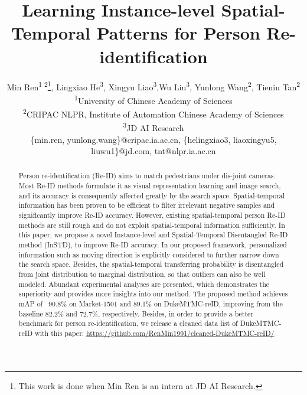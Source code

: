 \documentclass[10pt,twocolumn,letterpaper]{article}
\begin{document}
\title{Learning Instance-level Spatial-Temporal Patterns for Person Re-identification}

\author{Min Ren\textsuperscript{1 2}\thanks{This work is done when Min Ren is an intern at JD AI Research.}, Lingxiao He\textsuperscript{3}, Xingyu Liao\textsuperscript{3},Wu Liu\textsuperscript{3}, Yunlong Wang\textsuperscript{2}, Tieniu Tan\textsuperscript{2}\\
\textsuperscript{1}University of Chinese Academy of Sciences\\
\textsuperscript{2}CRIPAC NLPR, Institute of Automation Chinese Academy of Sciences\\
\textsuperscript{3}JD AI Research\\
\{min.ren, yunlong.wang\}@cripac.ia.ac.cn, \{helingxiao3, liaoxingyu5, liuwu1\}@jd.com, tnt@nlpr.ia.ac.cn
}

\maketitle
\ificcvfinal\thispagestyle{empty}\fi

\begin{abstract}
Person re-identification (Re-ID) aims to match pedestrians under dis-joint cameras.
Most Re-ID methods formulate it as visual representation learning and image search, and its accuracy is consequently affected greatly by the search space.
Spatial-temporal information has been proven to be efficient to filter irrelevant negative samples and significantly improve Re-ID accuracy.
However, existing spatial-temporal person Re-ID methods are still rough and do not exploit spatial-temporal information sufficiently.
In this paper, we propose a novel Instance-level and Spatial-Temporal Disentangled Re-ID method (InSTD), to improve Re-ID accuracy.
In our proposed framework, personalized information such as moving direction is explicitly considered to further narrow down the search space.
Besides, the spatial-temporal transferring probability is disentangled from joint distribution to marginal distribution, so that outliers can also be well modeled.
Abundant experimental analyses are presented, which demonstrates the superiority and provides more insights into our method.
The proposed method achieves mAP of~ 90.8\% on Market-1501 and 89.1\% on DukeMTMC-reID, improving from the baseline 82.2\% and 72.7\%, respectively. 
Besides, in order to provide a better benchmark for person re-identification, we release a cleaned data list of DukeMTMC-reID with this paper: \url{https://github.com/RenMin1991/cleaned-DukeMTMC-reID/}
\end{abstract}
\end{document}
